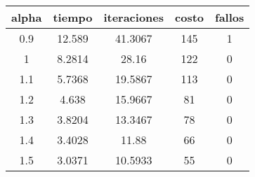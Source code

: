 \begin{table}[h!]
\centering
\begin{tabular}{ccccc}
alpha & tiempo & iteraciones & costo & fallos \\ 
\hline 
0.9 & 12.589 & 41.3067 & 145 & 1 \\ 
1 & 8.2814 & 28.16 & 122 & 0 \\ 
1.1 & 5.7368 & 19.5867 & 113 & 0 \\ 
1.2 & 4.638 & 15.9667 & 81 & 0 \\ 
1.3 & 3.8204 & 13.3467 & 78 & 0 \\ 
1.4 & 3.4028 & 11.88 & 66 & 0 \\ 
1.5 & 3.0371 & 10.5933 & 55 & 0 \\ 
\hline 
\end{tabular}
\end{table}